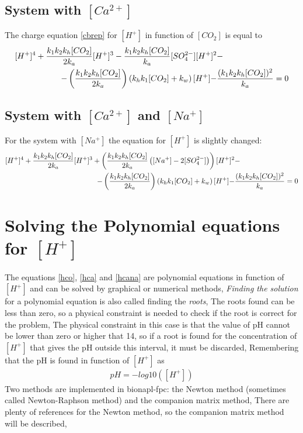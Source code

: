 \documentclass[11pt,a4paper,twoside]{report}
\begin{document}
\subsection{System with \texorpdfstring{$[Ca^{2+}]$}{Ca}}
The charge equation \eqref{cbrep} for $[H^{+}]$ in function of $[CO_{2}]$ is equal to 
\begin{align}\label{hca}
[H^{+}]^{4} + \frac{k_{1}k_{2}k_{h}[CO_{2}]}{2k_{a}}[H^{+}]^{3} - \frac{k_{1}k_{2}k_{h}[CO_{2}]}{k_{a}}[SO_{4}^{2-}][H^{+}]^{2} &- \\ \notag
-\left(\frac{k_{1}k_{2}k_{h}[CO_{2}]}{2k_{a}}\right)\left(k_{h}k_{1}[CO_{2}] + k_{w}\right)[H^{+}] -& \frac{(k_{1}k_{2}k_{h}[CO_{2}])^{2}}{k_{a}} = 0
\end{align}

\subsection{System with \texorpdfstring{$[Ca^{2+}]$}{Ca} and \texorpdfstring{$[Na^{+}]$}{Na}}
For the system with $[Na^{+}]$ the equation for $[H^{+}]$ is slightly changed:
\begin{align}\label{hcana}
[H^{+}]^{4} + \frac{k_{1}k_{2}k_{h}[CO_{2}]}{2k_{a}}[H^{+}]^{3} + \left(\frac{k_{1}k_{2}k_{h}[CO_{2}]}{2k_{a}}\left([Na^{+}] - 2[SO_{4}^{2-}]\right)\right)[H^{+}]^{2} &- \\ \notag
-\left(\frac{k_{1}k_{2}k_{h}[CO_{2}]}{2k_{a}}\right)\left(k_{h}k_{1}[CO_{2}] + k_{w}\right)[H^{+}] -& \frac{(k_{1}k_{2}k_{h}[CO_{2}])^{2}}{k_{a}} = 0
\end{align}

\section{Solving the Polynomial equations for \texorpdfstring{$[H^{+}]$}{H}}
The equations \eqref{hco}, \eqref{hca} and \eqref{hcana} are polynomial equations in function of $[H^{+}]$ and can be solved by graphical or numerical methods, \textit{Finding the solution} for a polynomial equation is also called finding the \textit{roots}, The roots found can be less than zero, so a physical constraint is needed to check if the root is correct for the problem, The physical constraint in this case is that the value of pH cannot be lower than zero or higher that 14, so if a root is found for the concentration of $[H^{+}]$ that gives the pH outside this interval, it must be discarded, Remembering that the pH is found in function of $[H^{+}]$ as 
\begin{align}
pH = -log10([H^{+}])
\end{align}
Two methods are implemented in bionapl-fpc: the Newton method (sometimes called Newton-Raphson method) and the companion matrix method, There are plenty of references for the Newton method, so the companion matrix method will be described,
\end{document}
